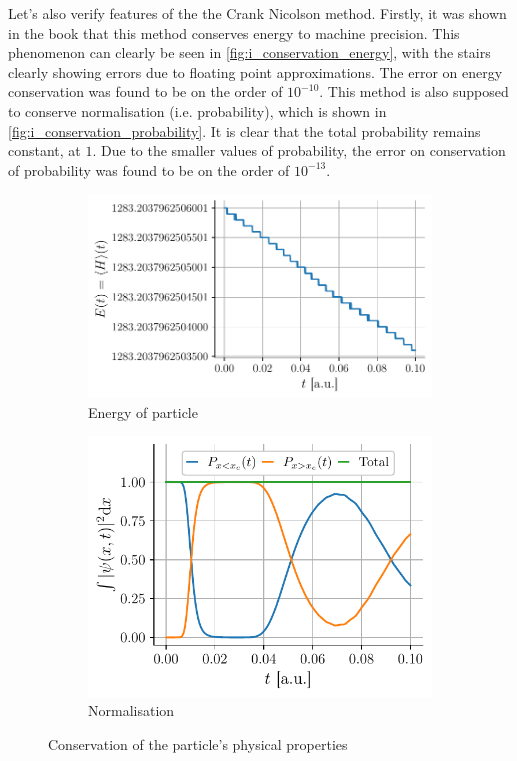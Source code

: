 Let's also verify features of the the Crank Nicolson method. Firstly, it was shown in the book \cite{physnumbook} that this method conserves energy to machine precision. This phenomenon can clearly be seen in \autoref{fig:i_conservation_energy}, with the stairs clearly showing errors due to floating point approximations. The error on energy conservation was found to be on the order of \(10^{-10}\). This method is also supposed to conserve normalisation (i.e. probability), which is shown in \autoref{fig:i_conservation_probability}. It is clear that the total probability remains constant, at \(1\). Due to the smaller values of probability, the error on conservation of probability was found to be on the order of \(10^{-13}\).

\begin{figure}[h]
    \centering
    \begin{subfigure}{0.55\linewidth}
        \centering
        \includegraphics[width=\linewidth]{figures/i_conservation_energy.pdf}
        \caption{Energy of particle}
        \label{fig:i_conservation_energy}
    \end{subfigure}
    \begin{subfigure}{0.44\linewidth}
        \centering
        \includegraphics[width=\linewidth]{figures/i_conservation_probability.pdf}
        \caption{Normalisation}
        \label{fig:i_conservation_probability}
    \end{subfigure}
    \caption{Conservation of the particle's physical properties}
    \label{fig:i_conservation}
\end{figure}

